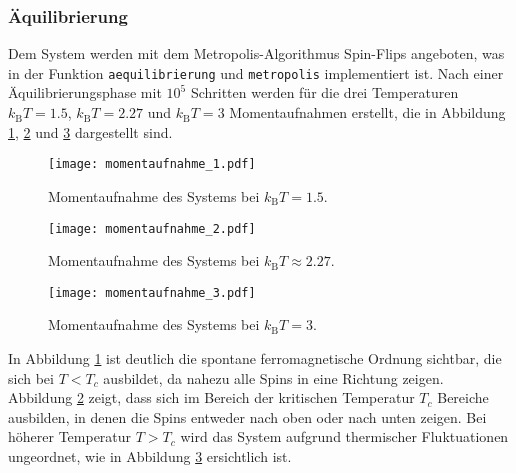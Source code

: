 \subsubsection*{Äquilibrierung}
Dem System werden mit dem Metropolis-Algorithmus Spin-Flips angeboten, was in der Funktion \texttt{aequilibrierung}
und \texttt{metropolis}
implementiert ist. Nach einer Äquilibrierungsphase mit $10^5$ Schritten werden für die drei Temperaturen $k_\text{B}T = 1.5$,
$k_\text{B}T = 2.27$ und $k_\text{B}T = 3$ Momentaufnahmen erstellt, die in Abbildung \ref{fig:2_moment_1}, \ref{fig:2_moment_2} 
und \ref{fig:2_moment_3} dargestellt sind.
\FloatBarrier
\begin{figure}[H]
    \centering
    \texttt{[image: momentaufnahme\_1.pdf]}
    \caption{Momentaufnahme des Systems bei $k_\text{B}T = 1.5$.}
    \label{fig:2_moment_1}
\end{figure}
\FloatBarrier
\noindent
\FloatBarrier
\begin{figure}[H]
    \centering
    \texttt{[image: momentaufnahme\_2.pdf]}
    \caption{Momentaufnahme des Systems bei $k_\text{B}T \approx 2.27$.}
    \label{fig:2_moment_2}
\end{figure}
\FloatBarrier
\noindent
\FloatBarrier
\begin{figure}[H]
    \centering
    \texttt{[image: momentaufnahme\_3.pdf]}
    \caption{Momentaufnahme des Systems bei $k_\text{B}T = 3$.}
    \label{fig:2_moment_3}
\end{figure}
\FloatBarrier
\noindent
In Abbildung \ref{fig:2_moment_1} ist deutlich die spontane ferromagnetische Ordnung sichtbar, die sich bei $T < T_c$
ausbildet, da nahezu alle Spins in eine Richtung zeigen.
Abbildung \ref{fig:2_moment_2} zeigt, dass sich im Bereich der kritischen Temperatur $T_c$ Bereiche ausbilden, 
in denen die Spins entweder nach oben oder nach unten zeigen. Bei höherer Temperatur $T > T_c$ wird das System
aufgrund thermischer Fluktuationen ungeordnet, wie in Abbildung \ref{fig:2_moment_3} ersichtlich ist. 

